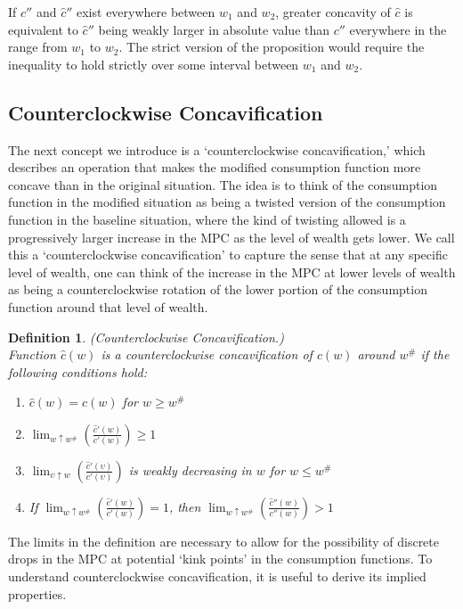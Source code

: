 \documentclass[titlepage]{\econtex}
\providecommand{\wAlt}{\omega}
\newtheorem{defn}{Definition}
\begin{document}
  \noindent If $c''$ and $\hat{c}''$ exist everywhere between $w_1$ and $w_2$, greater concavity of $\hat{c}$ is equivalent to $\hat{c}''$ being weakly larger in absolute value than $c''$ everywhere in the range from $w_1$ to $w_2$. The strict version of the proposition would require the inequality to hold strictly over some interval between $w_1$ and $w_2$.




  \subsection{Counterclockwise Concavification}\label{sec:CountC}
  The next concept we introduce is a `counterclockwise concavification,' which describes an operation that makes the modified consumption function more concave than in the original situation. The idea is to think of the consumption function in the modified situation as being a twisted version of the consumption function in the baseline situation, where the kind of twisting allowed is a progressively larger increase in the MPC as the level of wealth gets lower. We call this a `counterclockwise concavification' to capture the sense that at any specific level of wealth, one can think of the increase in the MPC at lower levels of wealth as being a counterclockwise rotation of the lower portion of the consumption function around that level of wealth.

  \begin{defn}\label{defn:cconcavification}(Counterclockwise Concavification.) \\
    Function $\hat{c}(w)$ is a counterclockwise concavification of $c(w)$ around $w^{\#}$ if the following conditions hold:
    \begin{enumerate}
    \item $\hat{c}(w) = c(w)$ for $w \geq w^{\#}$
    \item $\lim_{w \uparrow w^{\#}} \left(\frac{\hat{c}'(w)}{c'(w)}\right)  \geq 1$
    \item $\lim_{\upsilon \uparrow w} \left(\frac{\hat{c}'(\upsilon)}{c'(\upsilon)}\right)$ is weakly decreasing in $w$ for $w \leq w^{\#}$
    \item If $\lim_{w \uparrow w^{\#}} \left(\frac{\hat{c}'(w)}{c'(w)}\right)  = 1$, then $\lim_{w \uparrow w^{\#}} \left(\frac{\hat{c}''(w)}{c''(w)}\right) > 1$
    \end{enumerate}
  \end{defn}
  \noindent The limits in the definition are necessary to allow for the possibility of discrete drops in the MPC at potential `kink points' in the consumption functions. To understand counterclockwise concavification, it is useful to derive its implied properties.
\end{document}
